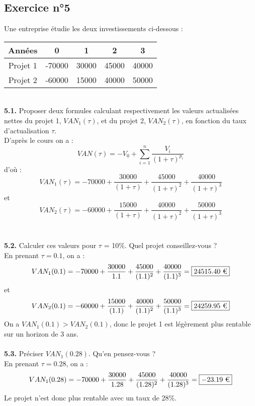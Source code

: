 \documentclass{article}
\begin{document}
\subsection{Exercice n°5}
\textcolor{exogris}{
Une entreprise étudie les deux investissements ci-dessous :
\begin{center}
\begin{tabular}{ |c|c|c|c|c| } 
 \hline
 Années & 0 & 1 & 2 & 3 \\ \hline
 Projet 1 & -70000 & 30000 & 45000 & 40000 \\ \hline
 Projet 2 & -60000 & 15000 & 40000 & 50000 \\
 \hline
\end{tabular}
\end{center}
}%
 
%
\\ \textcolor{exogris}{\textbf{5.1.}
Proposer deux formules calculant respectivement les valeurs actualisées nettes du projet 1, $VAN_1(\tau)$, et du projet 2, $VAN_2(\tau)$, en fonction du taux d’actualisation $\tau$.
}
\\%
D'après le cours on a :
$$VAN(\tau) = -V_0 + \sum_{i=1}^n \dfrac{V_i}{(1+\tau)^{p_i}}$$
d'où :
$$\boxed{VAN_1(\tau) = -70000 + \dfrac{30000}{(1+\tau)} + \dfrac{45000}{(1+\tau)^2} + \dfrac{40000}{(1+\tau)^3}}$$
et 
$$\boxed{VAN_2(\tau) = -60000 + \dfrac{15000}{(1+\tau)} + \dfrac{40000}{(1+\tau)^2} + \dfrac{50000}{(1+\tau)^3}}$$
\\%
\\%
\textcolor{exogris}{\textbf{5.2.}
Calculer ces valeurs pour $\tau$ = 10\%. Quel projet conseillez-vous ?
}
\\%
En prenant $\tau = 0.1$, on a :
$$VAN_1(0.1) = -70000 + \dfrac{30000}{1.1} + \dfrac{45000}{(1.1)^2} + \dfrac{40000}{(1.1)^3} = \boxed{24515.40 \text{ \texteuro}}$$
et 
$$VAN_2(0.1) = -60000 + \dfrac{15000}{(1.1)} + \dfrac{40000}{(1.1)^2} + \dfrac{50000}{(1.1)^3} = \boxed{24259.95 \text{ \texteuro}}$$
On a $VAN_1(0.1) > VAN_2(0.1)$, donc le projet 1 est légèrement plus rentable sur un horizon de 3 ans.
\\%
\\%
\textcolor{exogris}{\textbf{5.3.}
Préciser $VAN_1(0.28)$. Qu’en pensez-vous ?
}%
\\%
En prenant $\tau = 0.28$, on a :
$$VAN_1(0.28) = -70000 + \dfrac{30000}{1.28} + \dfrac{45000}{(1.28)^2} + \dfrac{40000}{(1.28)^3} = \boxed{-23.19 \text{ \texteuro}}$$
Le projet n'est donc plus rentable avec un taux de 28\%.
\end{document}
